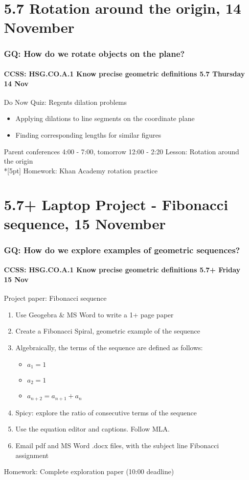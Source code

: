 \documentclass{beamer}
\begin{document}
\section{5.7 Rotation around the origin, 14 November}
\frame
{
  \frametitle{GQ: How do we rotate objects on the plane?}
  \framesubtitle{CCSS: HSG.CO.A.1 Know precise geometric definitions \hfill \alert{5.7 Thursday 14 Nov}}

  \begin{block}{Do Now Quiz: Regents dilation problems}
  \begin{itemize}
    \item Applying dilations to line segments on the coordinate plane
    \item Finding corresponding lengths for similar figures
  \end{itemize}
  \end{block}
  Parent conferences 4:00 - 7:00, tomorrow 12:00 - 2:20
  Lesson: Rotation around the origin\\*[5pt]
  Homework: Khan Academy rotation practice
}


\section{5.7+ Laptop Project - Fibonacci sequence, 15 November}
\frame
{
\frametitle{GQ: How do we explore examples of geometric sequences?}
\framesubtitle{CCSS: HSG.CO.A.1 Know precise geometric definitions \hfill \alert{5.7+ Friday 15 Nov}}

\begin{block}{Project paper: Fibonacci sequence}
\begin{enumerate}
  \item Use Geogebra \& MS Word to write a 1+ page paper
  \item Create a Fibonacci Spiral, geometric example of the sequence
  \item Algebraically, the terms of the sequence are defined as follows:
  \begin{itemize}
    \item $a_1=1$
    \item $a_2=1$
    \item $a_{n+2}=a_{n+1}+a_{n}$
  \end{itemize}
  \item Spicy: explore the ratio of consecutive terms of the sequence
  \item Use the equation editor and captions. Follow MLA.
  \item Email pdf and MS Word .docx files, with the subject line Fibonacci assignment
\end{enumerate}
\end{block}
Homework: Complete exploration paper (10:00 deadline)
}
\end{document}
